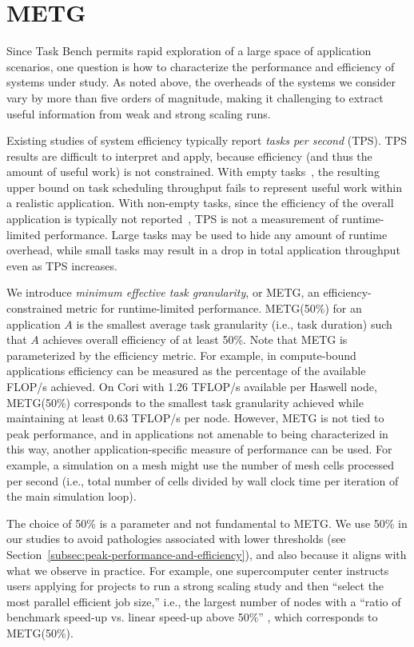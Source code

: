\section{METG}
\label{sec:metg}

Since Task Bench permits rapid exploration of a large space
of application scenarios, one question is how to characterize the
performance and efficiency of systems under study. As noted
above, the overheads of the systems we consider vary by more than
five orders of magnitude, making it challenging to extract useful
information from weak and strong scaling runs.

Existing studies of system efficiency
typically report \emph{tasks per second} (TPS). TPS results
are difficult to interpret and apply, because efficiency (and thus
the amount of useful work) is not constrained. With empty
tasks~\cite{LegionTracing18}, the resulting upper bound on task
scheduling throughput fails to represent useful work within a
realistic application. With non-empty tasks, since the efficiency of
the overall application is typically not reported~\cite{Canary16,
  Armstrong14}, TPS is not a measurement of runtime-limited
performance. Large tasks may be used to hide any amount of runtime
overhead, while small tasks may result in a drop in total application
throughput even as TPS increases.

We introduce \emph{minimum effective task granularity}, or METG, an
efficiency-constrained metric for runtime-limited
performance. METG(50\%) for an application $A$ is
the smallest average task granularity (i.e., task duration) such that $A$
achieves overall efficiency of at least 50\%. Note that METG is parameterized by the efficiency metric. For example, in
compute-bound applications efficiency can be measured as the
percentage of the available FLOP/s achieved. On Cori with 1.26 TFLOP/s available per Haswell node, METG(50\%) corresponds to
the smallest task granularity achieved while maintaining at least 0.63
TFLOP/s per node. However, METG is not tied to peak performance, and
in applications not amenable to being characterized in this way,
another application-specific measure of performance can be used. For
example, a simulation on a mesh might use the number of mesh cells
processed per second (i.e., total number of cells divided by wall
clock time per iteration of the main simulation loop).

The choice of 50\% is a parameter and not fundamental to METG. We use
50\% in our studies to avoid pathologies associated with lower
thresholds (see Section~\ref{subsec:peak-performance-and-efficiency}),
and also because it aligns with what we observe in practice. {\color{blue} For
example, one supercomputer center instructs users applying for
projects to run a strong scaling study and then ``select the most
parallel efficient job size,'' i.e., the largest number of nodes with
a ``ratio of benchmark speed-up vs. linear speed-up above 50\%''
\cite{CSCSReport}, which corresponds to METG(50\%).}

